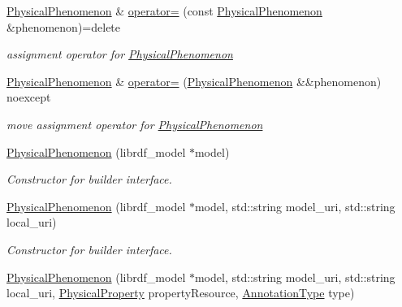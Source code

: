 \begin{DoxyCompactItemize}
\mbox{\label{classomexmeta_1_1PhysicalPhenomenon_aac3920bfe9bf16e071ebdd8ed4fabe2f}} 
\hyperlink{classomexmeta_1_1PhysicalPhenomenon}{Physical\+Phenomenon} \& \hyperlink{classomexmeta_1_1PhysicalPhenomenon_aac3920bfe9bf16e071ebdd8ed4fabe2f}{operator=} (const \hyperlink{classomexmeta_1_1PhysicalPhenomenon}{Physical\+Phenomenon} \&phenomenon)=delete
\begin{DoxyCompactList}\small\item\em assignment operator for \hyperlink{classomexmeta_1_1PhysicalPhenomenon}{Physical\+Phenomenon} \end{DoxyCompactList}\item 
\mbox{\label{classomexmeta_1_1PhysicalPhenomenon_af15355b4c2a361b4b02dca02d3877aed}} 
\hyperlink{classomexmeta_1_1PhysicalPhenomenon}{Physical\+Phenomenon} \& \hyperlink{classomexmeta_1_1PhysicalPhenomenon_af15355b4c2a361b4b02dca02d3877aed}{operator=} (\hyperlink{classomexmeta_1_1PhysicalPhenomenon}{Physical\+Phenomenon} \&\&phenomenon) noexcept
\begin{DoxyCompactList}\small\item\em move assignment operator for \hyperlink{classomexmeta_1_1PhysicalPhenomenon}{Physical\+Phenomenon} \end{DoxyCompactList}\item 
\hyperlink{classomexmeta_1_1PhysicalPhenomenon_aa140516da97b03960175f9bc04ecf865}{Physical\+Phenomenon} (librdf\+\_\+model $\ast$model)
\begin{DoxyCompactList}\small\item\em Constructor for builder interface. \end{DoxyCompactList}\item 
\hyperlink{classomexmeta_1_1PhysicalPhenomenon_a5c831ca76c36121b0fbc7b122b5539ac}{Physical\+Phenomenon} (librdf\+\_\+model $\ast$model, std\+::string model\+\_\+uri, std\+::string local\+\_\+uri)
\begin{DoxyCompactList}\small\item\em Constructor for builder interface. \end{DoxyCompactList}\item 
\hyperlink{classomexmeta_1_1PhysicalPhenomenon_a93bf263f7fdb65bd3e8de97983a7186b}{Physical\+Phenomenon} (librdf\+\_\+model $\ast$model, std\+::string model\+\_\+uri, std\+::string local\+\_\+uri, \hyperlink{classomexmeta_1_1PhysicalProperty}{Physical\+Property} property\+Resource, \hyperlink{namespaceomexmeta_a1129ebb8a92218ebb27b9c76ac8462f7}{Annotation\+Type} type)

\end{DoxyCompactItemize}
